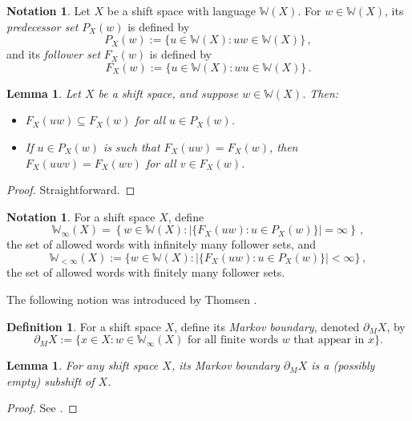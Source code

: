 \documentclass[reqno,11pt]{amsart}
\newtheorem{lem}[thm]{Lemma}
\theoremstyle{definition}
\newtheorem{defn}[thm]{Definition}
\newtheorem{notation}[thm]{Notation}
\theoremstyle{remark}
\theoremstyle{remark}
\def\w{\mathbb{W}}
\numberwithin{equation}{section}
\begin{document}
\begin{notation}
Let $X$ be a shift space with language $\w(X)$. For
$w\in \mathbb{W}(X)$, its \emph{predecessor set} $P_X(w)$ is defined by 
$$P_X(w):=\{u\in \mathbb{W}(X): uw\in\w(X)\}\,,$$
and its \emph{follower set} $F_X(w)$ is defined by 
$$F_X(w):=\{u\in \mathbb{W}(X): wu\in\w(X)\}\,.$$
\end{notation}



\begin{lem}\label{lem-00}
	Let $X$ be a shift space, and suppose $w\in\w(X)$. Then: 
\begin{itemize}
		\item[(a)]$F_X(uw)\subseteq F_X(w)$ for all $u\in P_X(w)$.
		\item[(b)]If $u\in P_X(w)$ is such that $F_X(uw)= F_X(w)$, then $F_X(uwv)=F_X(wv)$ for all $v\in F_X(w)$.
	\end{itemize}
\end{lem}
\begin{proof}
Straightforward.
\end{proof}

\begin{notation}
For a shift space $X$, define
\begin{equation}\label{equ:inftywords}
\w_\infty(X)=\left\{w\in \w(X) : |\{F_X(uw): u\in P_X(w)\}|=\infty\right\}\,,
\end{equation}
the set of allowed words with infinitely many follower sets,
and
\begin{equation}\label{equ:finitewords}
\mathbb{W}_{<\infty}(X):=\{w\in \mathbb{W}(X) : |\{F_X(uw): u\in P_X(w)\}|<\infty\}\,,
\end{equation}
the set of allowed words with finitely many follower sets.
\end{notation}


The following notion was introduced by Thomsen \cite{Tho06}.

\begin{defn}
For a shift space $X$,
define its \emph{Markov boundary}, denoted $\partial_M X$, by
\begin{equation}\label{equ:markovboundary}
\partial_MX:=\{x\in X:  w\in \mathbb{W}_\infty(X) \text{ for all finite words $w$ that appear in } x\}.
\end{equation}
\end{defn}


\begin{lem} For any shift space $X$, its Markov boundary  
$\partial_MX$ is a (possibly empty) subshift of $X$.
\end{lem}
\begin{proof}
See \cite[Lem.~2.1]{Tho06}.
\end{proof}
\end{document}
